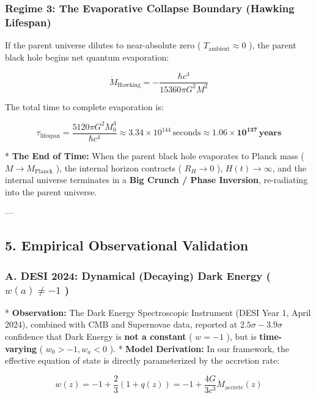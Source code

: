 \documentclass[11pt,a4paper]{article}
\theoremstyle{definition}
\theoremstyle{remark}
\begin{document}
\subsubsection{Regime 3: The Evaporative Collapse Boundary (Hawking Lifespan)}
If the parent universe dilutes to near-absolute zero ( $T_{\text{ambient}} \approx 0$ ), the parent black hole begins net quantum evaporation:


\begin{equation}
\dot{M}_{\text{Hawking}} = -\frac{\hbar c^4}{15360 \pi G^2 M^2}
\end{equation}


The total time to complete evaporation is:


\begin{equation}
\boxed{\tau_{\text{lifespan}} = \frac{5120 \pi G^2 M_0^3}{\hbar c^4} \approx 3.34 \times 10^{144} \, \text{seconds} \approx \mathbf{1.06 \times 10^{137} \, \text{years}}}
\end{equation}


* \textbf{The End of Time:} When the parent black hole evaporates to Planck mass ( $M \to M_{\text{Planck}}$ ), the internal horizon contracts ( $R_H \to 0$ ), $H(t) \to \infty$, and the internal universe terminates in a \textbf{Big Crunch / Phase Inversion}, re-radiating into the parent universe.

---

\subsection{5. Empirical Observational Validation}

\subsubsection{A. DESI 2024: Dynamical (Decaying) Dark Energy ( $w(a) \neq -1$ )}
* \textbf{Observation:} The Dark Energy Spectroscopic Instrument (DESI Year 1, April 2024), combined with CMB and Supernovae data, reported at $2.5\sigma - 3.9\sigma$ confidence that Dark Energy is \textbf{not a constant} ( $w = -1$ ), but is \textbf{time-varying} ( $w_0 > -1, w_a < 0$ ).
* \textbf{Model Derivation:} In our framework, the effective equation of state is directly parameterized by the accretion rate:


\begin{equation}
w(z) = -1 + \frac{2}{3}(1 + q(z)) = -1 + \frac{4G}{3 c^3} \dot{M}_{\text{accrete}}(z)
\end{equation}
\end{document}
